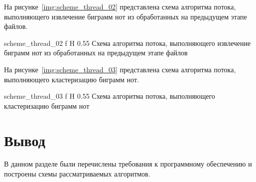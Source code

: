 На рисунке~\ref{img:scheme_thread_02} представлена схема алгоритма потока, выполняющего извлечение биграмм нот из обработанных на предыдущем этапе файлов.

	{scheme_thread_02}
	{f}
	{H}
	{0.55\textwidth}
	{Схема алгоритма потока, выполняющего извлечение биграмм нот из обработанных на предыдущем этапе файлов}
	
На рисунке~\ref{img:scheme_thread_03} представлена схема алгоритма потока, выполняющего кластеризацию биграмм нот.

	{scheme_thread_03}
	{f}
	{H}
	{0.55\textwidth}
	{Схема алгоритма потока, выполняющего кластеризацию биграмм нот}

\section*{Вывод}
В данном разделе были перечислены требования к программному обеспечению и построены схемы рассматриваемых алгоритмов.